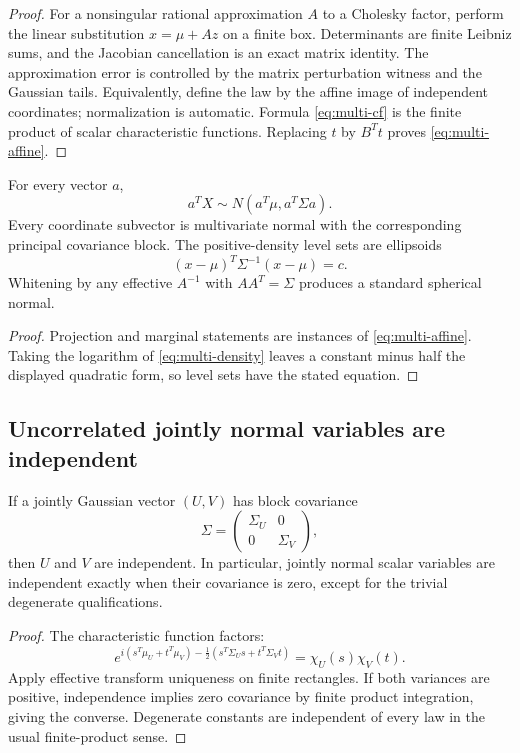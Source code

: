 \begin{proof}
For a nonsingular rational approximation $A$ to a Cholesky factor, perform the linear substitution $x=\mu+Az$ on a finite box.  Determinants are finite Leibniz sums, and the Jacobian cancellation is an exact matrix identity.  The approximation error is controlled by the matrix perturbation witness and the Gaussian tails.  Equivalently, define the law by the affine image of independent coordinates; normalization is automatic.  Formula \eqref{eq:multi-cf} is the finite product of scalar characteristic functions.  Replacing $t$ by $B^Tt$ proves \eqref{eq:multi-affine}.
\end{proof}

\begin{corollary}\label{cor:projections}
For every vector $a$,
\[
 a^TX\sim N(a^T\mu,a^T\Sigma a).
\]
Every coordinate subvector is multivariate normal with the corresponding principal covariance block.  The positive-density level sets are ellipsoids
\[
 (x-\mu)^T\Sigma^{-1}(x-\mu)=c.
\]
Whitening by any effective $A^{-1}$ with $AA^T=\Sigma$ produces a standard spherical normal.
\end{corollary}

\begin{proof}
Projection and marginal statements are instances of \eqref{eq:multi-affine}.  Taking the logarithm of \eqref{eq:multi-density} leaves a constant minus half the displayed quadratic form, so level sets have the stated equation.
\end{proof}

\subsection{Uncorrelated jointly normal variables are independent}

\begin{theorem}\label{thm:joint-normal-independence}
If a jointly Gaussian vector $(U,V)$ has block covariance
\[
 \Sigma=\begin{pmatrix}\Sigma_U&0\\0&\Sigma_V\end{pmatrix},
\]
then $U$ and $V$ are independent.  In particular, jointly normal scalar variables are independent exactly when their covariance is zero, except for the trivial degenerate qualifications.
\end{theorem}

\begin{proof}
The characteristic function factors:
\[
 e^{i(s^T\mu_U+t^T\mu_V)-\frac12(s^T\Sigma_Us+t^T\Sigma_Vt)}
 =\chi_U(s)\chi_V(t).
\]
Apply effective transform uniqueness on finite rectangles.  If both variances are positive, independence implies zero covariance by finite product integration, giving the converse.  Degenerate constants are independent of every law in the usual finite-product sense.
\end{proof}

